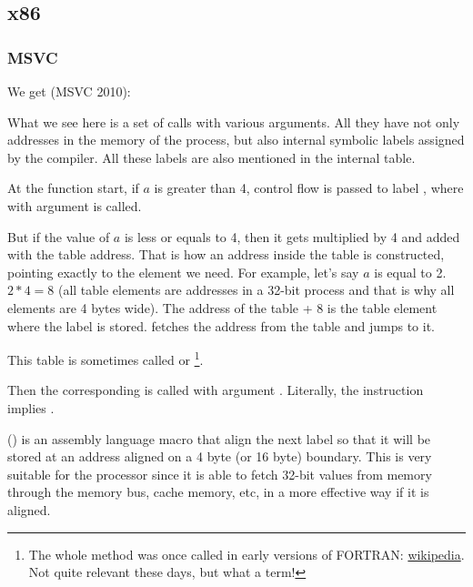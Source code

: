 \subsection{x86}

\subsubsection{\NonOptimizing MSVC}

We get (MSVC 2010):




What we see here is a set of \printf calls with various arguments. 
All they have not only addresses in the memory of the process, but also internal symbolic labels assigned 
by the compiler. 
All these labels are also mentioned in the  internal table.

At the function start, if $a$ is greater than 4, control flow is passed to label 
, where \printf with argument  is called.

But if the value of $a$ is less or equals to 4, then it gets multiplied by 4 and added with the  
table address. That is how an address inside the table is constructed, pointing exactly to the 
element we need. For example, let's say $a$ is equal to 2. $2*4 = 8$ (all table elements 
are addresses in a 32-bit process and that is why all elements are 4 bytes wide). 
The address of the  table + 8 is the table element where the  label is stored.
\JMP fetches the  address from the table and jumps to it.

This table is sometimes called  or \footnote{The whole method was once called 
 in early versions of FORTRAN:
\href{http://go.yurichev.com/17122}{wikipedia}.
Not quite relevant these days, but what a term!}.

Then the corresponding \printf is called with argument .
Literally, the  instruction implies
 .

 () is an assembly language macro that align the next label so that it will be stored at an address aligned on a 4 byte
(or 16 byte) boundary.
This is very suitable for the processor since it is able to fetch 32-bit values from memory through the memory bus,
cache memory, etc, in a more effective way if it is aligned.


